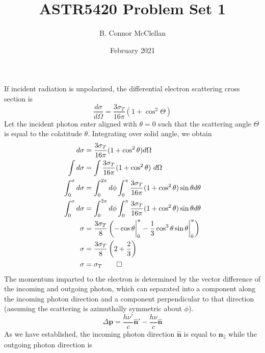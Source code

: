 \documentclass{article}
\title{ASTR5420 Problem Set 1}
\author{B. Connor McClellan}
\date{February 2021}
\begin{document}
\maketitle


\section{}
If incident radiation is unpolarized, the differential electron scattering cross section is
%
\begin{equation}
    \frac{d\sigma}{d\Omega} = \frac{3 \sigma_T}{16\pi}(1 + \cos^2 \Theta)
\end{equation}
%
Let the incident photon enter aligned with $\theta=0$ such that the scattering angle $\Theta$ is equal to the colatitude $\theta$.  Integrating over solid angle, we obtain
%
\begin{equation*} \label{exsec}
    \begin{split}
        d\sigma &= \frac{3 \sigma_T}{16\pi}(1 + \cos^2 \theta) d\Omega\\
        \int d\sigma &= \int \frac{3 \sigma_T}{16\pi}(1 + \cos^2 \theta)\ d\Omega \\
        \int_0^\sigma d\sigma &= \int_0^{2\pi}d\phi\int_0^\pi \frac{3 \sigma_T}{16\pi}(1 + \cos^2 \theta)\sin \theta d\theta \\
        \int_0^\sigma d\sigma &= \int_0^{2\pi}d\phi\int_0^\pi \frac{3 \sigma_T}{16\pi}(1 + \cos^2 \theta)\sin \theta d\theta \\
        \sigma &= \frac{3 \sigma_T}{8} \left( -\cos \theta \bigg\rvert_0^\pi - \frac{1}{3}\cos^3 \theta \sin \theta \bigg\rvert_0^\pi\right)\\
        \sigma &= \frac{3 \sigma_T}{8} \left(2 + \frac{2}{3}\right)\\
        \sigma &= \sigma_T \qed
    \end{split}
\end{equation*}
%
The momentum imparted to the electron is determined by the vector difference of the incoming and outgoing photon, which can separated into a component along the incoming photon direction and a component perpendicular to that direction (assuming the scattering is azimuthally symmetric about $\phi$).
%
\begin{equation}
    \Delta \mathbf{p} = \frac{h\nu'}{c} \mathbf{\hat n'} - \frac{h\nu}{c}\mathbf{\hat n}
\end{equation}
%
As we have established, the incoming photon direction $\mathbf{\hat n}$ is equal to $\mathbf{n_\parallel}$ while the outgoing photon direction is 
\end{document}
